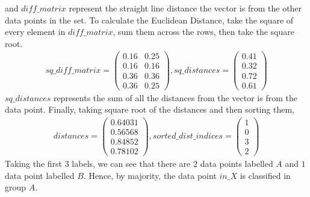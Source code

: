 \documentclass[11pt]{article}
\begin{document}
and $diff\_matrix$ represent the straight line distance the vector is from the other data points in the set. To calculate the Euclidean Distance, take the square of every element in $diff\_matrix$, sum them across the rows, then take the square root.
\begin{align*}
sq\_diff\_matrix = 
\begin{pmatrix}
0.16&0.25\\0.16&0.16\\0.36&0.36\\0.36&0.25\end{pmatrix},
sq\_distances = 
\begin{pmatrix}
0.41\\0.32\\0.72\\0.61\end{pmatrix}
\end{align*}
$sq\_distances$ represents the sum of all the distances from the vector is from the data point. Finally, taking square root of the distances and then sorting them,
\begin{align*}
distances = \begin{pmatrix}
0.64031\\0.56568 \\0.84852\\0.78102
\end{pmatrix},  
sorted\_dist\_indices = 
\begin{pmatrix}
1\\0\\3\\2\end{pmatrix}
\end{align*}
Taking the first 3 labels, we can see that there are $2$ data points labelled $A$ and $1$ data point labelled $B$. Hence, by majority, the data point $in\_X$ is classified in group $A$.
\end{document}

